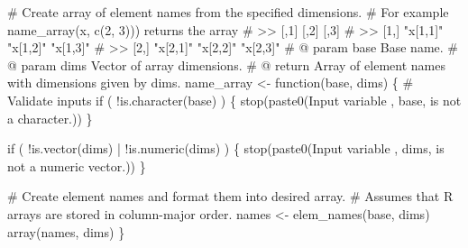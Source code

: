 \documentclass[
  letterpaper,
  DIV=11,
  numbers=noendperiod]{scrartcl}
\newenvironment{Shaded}{\begin{snugshade}}{\end{snugshade}}
\newcommand{\CommentTok}[1]{\textcolor[rgb]{0.37,0.37,0.37}{#1}}
\newcommand{\ControlFlowTok}[1]{\textcolor[rgb]{0.00,0.23,0.31}{#1}}
\newcommand{\KeywordTok}[1]{\textcolor[rgb]{0.00,0.23,0.31}{#1}}
\newcommand{\NormalTok}[1]{\textcolor[rgb]{0.00,0.23,0.31}{#1}}
\newcommand{\OperatorTok}[1]{\textcolor[rgb]{0.37,0.37,0.37}{#1}}
\newcommand{\StringTok}[1]{\textcolor[rgb]{0.13,0.47,0.30}{#1}}
\begin{document}
\begin{Shaded}
\begin{Highlighting}[]
\CommentTok{\# Create array of element names from the specified dimensions.}
\CommentTok{\# For example \textasciigrave{}name\_array(\textquotesingle{}x\textquotesingle{}, c(2, 3)))\textasciigrave{} returns the array}
\CommentTok{\# \textgreater{}\textgreater{}      [,1]     [,2]     [,3]}
\CommentTok{\# \textgreater{}\textgreater{} [1,] "x[1,1]" "x[1,2]" "x[1,3]"}
\CommentTok{\# \textgreater{}\textgreater{} [2,] "x[2,1]" "x[2,2]" "x[2,3]"}
\CommentTok{\# @ param base Base name.}
\CommentTok{\# @ param dims Vector of array dimensions.}
\CommentTok{\# @ return Array of element names with dimensions given by dims.}
\NormalTok{name\_array }\OperatorTok{\textless{}{-}}\NormalTok{ function(base, dims) \{}
  \CommentTok{\# Validate inputs}
  \ControlFlowTok{if}\NormalTok{ ( }\OperatorTok{!}\KeywordTok{is}\NormalTok{.character(base) ) \{}
\NormalTok{    stop(paste0(}\StringTok{\textquotesingle{}Input variable \textquotesingle{}}\NormalTok{, base, }\StringTok{\textquotesingle{} is not a character.\textquotesingle{}}\NormalTok{))}
\NormalTok{  \}}

  \ControlFlowTok{if}\NormalTok{ ( }\OperatorTok{!}\KeywordTok{is}\NormalTok{.vector(dims) }\OperatorTok{|} \OperatorTok{!}\KeywordTok{is}\NormalTok{.numeric(dims) ) \{}
\NormalTok{    stop(paste0(}\StringTok{\textquotesingle{}Input variable \textquotesingle{}}\NormalTok{, dims, }\StringTok{\textquotesingle{} is not a numeric vector.\textquotesingle{}}\NormalTok{))}
\NormalTok{  \}}

  \CommentTok{\# Create element names and format them into desired array.}
  \CommentTok{\# Assumes that R arrays are stored in column{-}major order.}
\NormalTok{  names }\OperatorTok{\textless{}{-}}\NormalTok{ elem\_names(base, dims)}
\NormalTok{  array(names, dims)}
\NormalTok{\}}
\end{Highlighting}
\end{Shaded}
\end{document}
